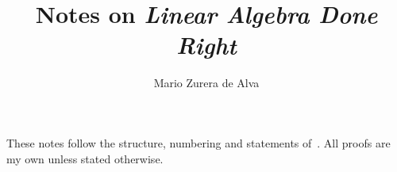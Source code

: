 \documentclass[12pt]{article}
\title{Notes on \emph{Linear Algebra Done Right}}
\author{Mario Zurera de Alva}
\date{}
\begin{document}
\maketitle

\noindent These notes follow the structure, numbering and statements of~\cite{axler}. All proofs are my own unless stated otherwise.

\tableofcontents



\printbibliography %
\end{document}
